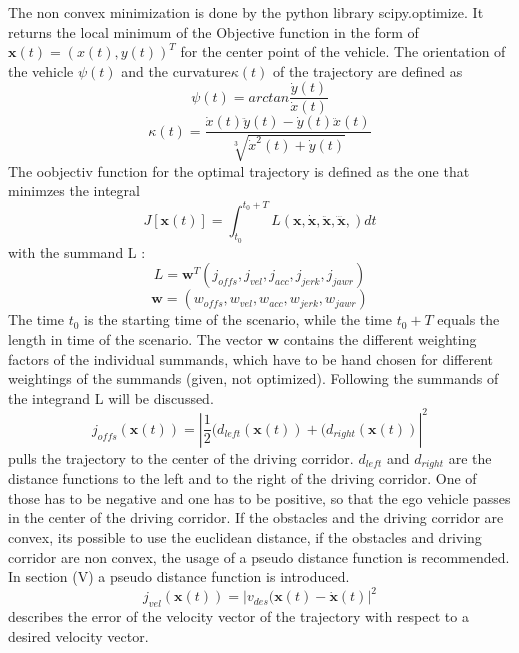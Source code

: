 \documentclass[conference]{IEEEtran}
\begin{document}
The non convex minimization is done by the python library scipy.optimize. It returns the local minimum of the Objective function in the form of $\mathbf{x}(t) = (x(t), y(t))^T$ for the center point of the vehicle. The orientation of the vehicle $\psi (t) $ and the curvature$\kappa(t)$  of the trajectory are defined as
\begin{equation}
\psi (t) = arctan\frac{\dot{y}(t)}{\dot{x}(t)}
\end{equation}
\begin{equation}
\kappa (t) = \frac{\dot{x}(t) \ddot{y}(t) -\dot{y}(t) \ddot{x}(t) }{\sqrt[3]{\dot{x}^2(t)+\dot{y}(t)}}
\end{equation}
The oobjectiv function for the optimal trajectory is defined as the one that minimzes the integral
\begin{equation}
J\left[\mathbf{x}(t)\right]   = \int_{t_0}^{t_0 + T} L(\mathbf{x},\mathbf{\dot{x}},\mathbf{\ddot{x}},\mathbf{\dddot{x}},) dt
\end{equation}
with the summand L :
\begin{equation}
L  = \mathbf{w}^T(j_{offs}, j_{vel}, j_{acc}, j_{jerk}, j_{jawr})
\end{equation}
\begin{equation}
\mathbf{w} = (w_{offs} , w_{vel} ,w_{acc} ,w_{jerk} ,w_{jawr})
\end{equation}
The time $t_0$ is the starting time of the scenario, while the time $t_0 +T$ equals the length in time of the scenario. The vector $\mathbf{w}$ contains the different weighting factors of the individual summands, which have to be hand chosen for different weightings of the summands (given, not optimized).
Following the summands of the integrand L will be discussed.
$$ j_{offs}(\mathbf{x}(t)) = \left|\frac{1}{2}(d_{left}(\mathbf{x}(t))+ (d_{right}(\mathbf{x}(t))\right|^2 $$
pulls the trajectory to the center of the driving corridor. $d_{left}$ and $d_{right}$ are the distance functions to the left and to the right of the driving corridor. One of those has to be negative and one has to be positive, so that the ego vehicle passes in the center of the driving corridor. If the  obstacles and the driving corridor are convex, its possible to use the euclidean distance, if the obstacles and driving corridor are non convex, the usage of a pseudo distance function is recommended. In section (V) a pseudo distance function is introduced.
$$ j_{vel}(\mathbf{x}(t)) = \left| v_{des}(\mathbf{x}(t) - \mathbf{\dot{x}}(t) \right|^2 $$
describes the error of the velocity vector of the trajectory with respect to a desired velocity vector.
\end{document}
